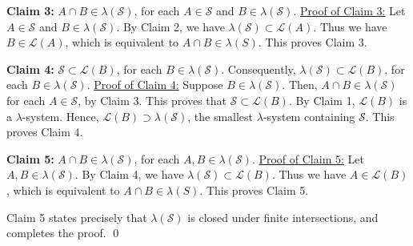 	\vskip 0.5cm
	\begin{center}
	\begin{minipage}{6.5in}
	\textbf{Claim 3:}\quad
	$A \cap B \in \lambda(\mathcal{S})$, for each $A \in \mathcal{S}$ and $B \in \lambda(\mathcal{S})$.
	\vskip 0.1cm
	\noindent
	\underline{Proof of Claim 3:}\quad
	Let $A \in \mathcal{S}$ and $B \in \lambda(\mathcal{S})$.
	By Claim 2, we have $\lambda(\mathcal{S}) \subset \mathcal{L}(A)$.
	Thus we have $B \in \mathcal{L}(A)$, which is equivalent to $A \cap B \in \lambda(S)$.
	This proves Claim 3.
	\end{minipage}
	\end{center}

	\vskip 0.5cm
	\begin{center}
	\begin{minipage}{6.5in}
	\textbf{Claim 4:}\quad
	$\mathcal{S} \subset \mathcal{L}(B)$, for each $B \in \lambda(\mathcal{S})$.
	Consequently, $\lambda(\mathcal{S}) \subset \mathcal{L}(B)$, for each $B \in \lambda(\mathcal{S})$.
	\vskip 0.1cm
	\noindent
	\underline{Proof of Claim 4:}\quad
	Suppose $B \in \lambda(\mathcal{S})$.
	Then, $A \cap B \in \lambda(\mathcal{S})$ for each $A \in \mathcal{S}$, by Claim 3.
	This proves that $\mathcal{S} \subset \mathcal{L}(B)$.
	By Claim 1, $\mathcal{L}(B)$ is a $\lambda$-system.
	Hence, $\mathcal{L}(B) \supset \lambda(\mathcal{S})$, the smallest $\lambda$-system containing $\mathcal{S}$.
	This proves Claim 4.
	\end{minipage}
	\end{center}

	\vskip 0.5cm
	\begin{center}
	\begin{minipage}{6.5in}
	\textbf{Claim 5:}\quad
	$A \cap B \in \lambda(\mathcal{S})$, for each $A, B \in \lambda(\mathcal{S})$.
	\vskip 0.1cm
	\noindent
	\underline{Proof of Claim 5:}\quad
	Let $A, B \in \lambda(\mathcal{S})$.
	By Claim 4, we have $\lambda(\mathcal{S}) \subset \mathcal{L}(B)$.
	Thus we have $A \in \mathcal{L}(B)$, which is equivalent to $A \cap B \in \lambda(S)$.
	This proves Claim 5.
	\end{minipage}
	\end{center}

\vskip 0.5cm
\noindent
Claim 5 states precisely that $\lambda(\mathcal{S})$ is closed under finite intersections,
and completes the proof.
\qed

